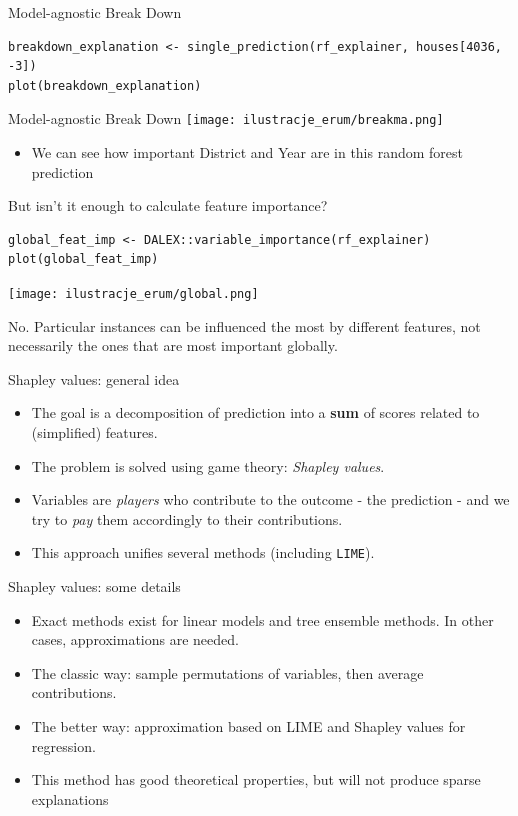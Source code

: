\documentclass[xcolor={dvipsnames}]{beamer}
\begin{document}
\begin{frame}[fragile]{Model-agnostic Break Down}
	\begin{lstlisting}
breakdown_explanation <- single_prediction(rf_explainer, houses[4036, -3])
plot(breakdown_explanation)
	\end{lstlisting}
\end{frame}


\begin{frame}{Model-agnostic Break Down}
	\centering
	\texttt{[image: ilustracje\_erum/breakma.png]}
	\begin{itemize}
		\item We can see how important District and Year are in this random forest prediction
	\end{itemize}
\end{frame}

\begin{frame}[fragile]{But isn't it enough to calculate feature importance?}
	\begin{lstlisting}
global_feat_imp <- DALEX::variable_importance(rf_explainer)
plot(global_feat_imp)
	\end{lstlisting}
	\centering
	\texttt{[image: ilustracje\_erum/global.png]}	
	
	No. Particular instances can be influenced the most by different features,
	not necessarily the ones that are most important globally.
\end{frame}

\begin{frame}{Shapley values: general idea}
  \begin{itemize}
	\item The goal is a decomposition of prediction into a \textbf{sum} of scores related to (simplified) features.
	\item The problem is solved using game theory: \textit{Shapley values}. 
	\item Variables are \textit{players} who contribute to the outcome - the prediction - and we try to \textit{pay} them accordingly to their contributions.
	\item This approach unifies several methods (including \texttt{LIME}).
  \end{itemize}
\end{frame}

\begin{frame}{Shapley values: some details}
	\begin{itemize}
		\item Exact methods exist for linear models and tree ensemble methods.
		In other cases, approximations are needed.
		
		\item The classic way: sample permutations of variables, then average contributions.
		
		\item The better way: approximation based on LIME and Shapley values for regression.
		
		\item This method has good theoretical properties, but will not produce sparse explanations
	\end{itemize}
\end{frame}
\end{document}
